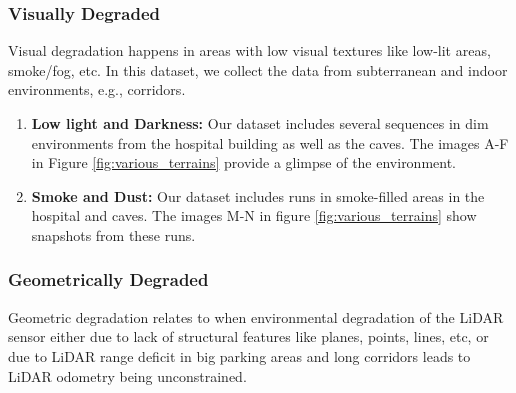 \documentclass[10pt,twocolumn,letterpaper]{article}
\begin{document}
\subsubsection{ Visually Degraded}
Visual degradation happens in areas with low visual textures like low-lit areas, smoke/fog, etc.
In this dataset, we collect the data from subterranean and indoor environments, e.g., corridors.

\begin{enumerate}[label=(\alph*)]
    \item \textbf{Low light and Darkness:} Our dataset includes several sequences in dim environments from the hospital building as well as the caves. 
    The images A-F in Figure \ref{fig:various_terrains} provide a glimpse of the environment.
    \item \textbf{Smoke and Dust:} Our dataset includes runs in smoke-filled areas in the hospital and caves. The images M-N in figure \ref{fig:various_terrains} show snapshots from these runs.
    
    
\end{enumerate}

\subsubsection{ Geometrically Degraded}
Geometric degradation relates to when environmental degradation of the LiDAR sensor either due to lack of structural features like planes, points, lines, etc, or due to LiDAR range deficit in big parking areas and long corridors leads to LiDAR odometry being unconstrained.
\end{document}
